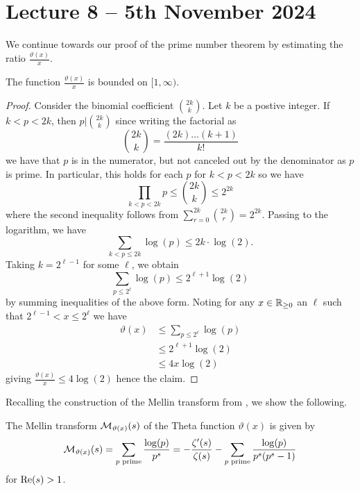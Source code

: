 \section{Lecture 8 -- 5th November 2024}\label{sec: lecture 8}
We continue towards our proof of the prime number theorem by estimating the ratio $\frac{\vartheta(x)}{x}$. 
\begin{lemma}\label{lem: boundedness of theta function ratio}
    The function $\frac{\vartheta(x)}{x}$ is bounded on $[1,\infty)$. 
\end{lemma}
\begin{proof}
    Consider the binomial coefficient $\binom{2k}{k}$. Let $k$ be a postive integer. If $k<p<2k$, then $p|\binom{2k}{k}$ since writing the factorial as 
    $$\binom{2k}{k}=\frac{(2k)\dots(k+1)}{k!}$$
    we have that $p$ is in the numerator, but not canceled out by the denominator as $p$ is prime. In particular, this holds for each $p$ for $k<p<2k$ so we have 
    $$\prod_{k<p<2k}p\leq\binom{2k}{k}\leq 2^{2k}$$
    where the second inequality follows from $\sum_{r=0}^{2k}\binom{2k}{r}=2^{2k}$. Passing to the logarithm, we have 
    $$\sum_{k<p\leq 2k}\log(p)\leq 2k\cdot\log(2).$$
    Taking $k=2^{\ell-1}$ for some $\ell$, we obtain 
    $$\sum_{p\leq 2^{\ell}}\log(p)\leq2^{\ell+1}\log(2)$$
    by summing inequalities of the above form. Noting for any $x\in\mathbb{R}_{\geq0}$ an $\ell$ such that $2^{\ell-1}<x\leq 2^{\ell}$ we have 
    \begin{align*}
        \vartheta(x) &\leq \sum_{p\leq 2^{\ell}}\log(p) \\
        &\leq 2^{\ell+1}\log(2) \\
        &\leq 4x\log(2)
    \end{align*}
    giving $\frac{\vartheta(x)}{x}\leq 4\log(2)$ hence the claim. 
\end{proof}
Recalling the construction of the Mellin transform from , we show the following. 
\begin{lemma}\label{lem: mellin tranfsormation of theta function}
    The Mellin transform $\mathcal{M}_{\vartheta(x)}(s)$ of the Theta function $\vartheta(x)$ is given by 
    $$\mathcal{M}_{\vartheta(x)}(s)=\sum_{p\text{ prime}}\frac{\log(p)}{p^{s}}=-\frac{\zeta'(s)}{\zeta(s)}-\sum_{p\text{ prime}}\frac{\log(p)}{p^{s}(p^{s}-1)}$$
    for $\mathrm{Re}(s)>1$. 
\end{lemma}

